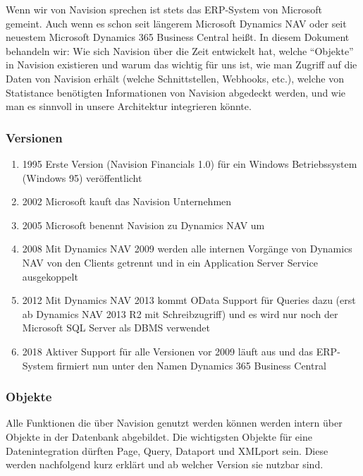 Wenn wir von Navision sprechen ist stets das ERP-System von Microsoft gemeint. Auch wenn es schon seit längerem Microsoft Dynamics NAV oder seit neuestem Microsoft Dynamics 365 Business Central heißt. In diesem Dokument behandeln wir: 
Wie sich Navision über die Zeit entwickelt hat,
welche “Objekte” in Navision existieren und warum das wichtig für uns ist,
wie man Zugriff auf die Daten von Navision erhält (welche Schnittstellen, Webhooks, etc.),
welche von Statistance benötigten Informationen von Navision abgedeckt werden,
und wie man es sinnvoll in unsere Architektur integrieren könnte.

\subsubsection*{Versionen}
\begin{enumerate}
\item 1995 Erste Version (Navision Financials 1.0) für ein Windows Betriebssystem (Windows 95) veröffentlicht
\item 2002 Microsoft kauft das Navision Unternehmen
\item 2005 Microsoft benennt Navision zu Dynamics NAV um
\item 2008 Mit Dynamics NAV 2009 werden alle internen Vorgänge von Dynamics NAV von den Clients getrennt und in ein Application Server Service ausgekoppelt
\item 2012 Mit Dynamics NAV 2013 kommt OData Support für Queries dazu (erst ab Dynamics NAV 2013 R2 mit Schreibzugriff) und es wird nur noch der Microsoft SQL Server als DBMS verwendet
\item 2018 Aktiver Support für alle Versionen vor 2009 läuft aus und das ERP-System firmiert nun unter den Namen Dynamics 365 Business Central
\end{enumerate}

\subsubsection*{Objekte}
Alle Funktionen die über Navision genutzt werden können werden intern über Objekte in der Datenbank abgebildet. Die wichtigsten Objekte für eine Datenintegration dürften Page, Query, Dataport und XMLport sein. Diese werden nachfolgend kurz erklärt und ab welcher Version sie nutzbar sind.

